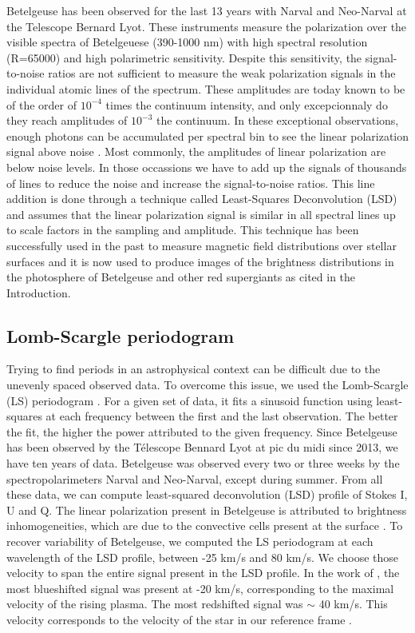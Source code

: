 \documentclass{aa}
\begin{document}
Betelgeuse has been observed for the last 13 years with Narval and Neo-Narval at the Telescope Bernard Lyot. These instruments measure the polarization 
over the visible spectra of Betelgeuese (390-1000 nm) with high spectral resolution (R=65000) and high polarimetric sensitivity. Despite 
this sensitivity, the signal-to-noise ratios are not sufficient to measure the weak polarization signals in the individual atomic lines of the 
spectrum. These amplitudes are today known to be of the order of $10^{-4}$ times the continuum intensity, and only excepcionnaly do they 
reach amplitudes of $10^{-3}$ the continuum. In these exceptional observations, enough photons can be accumulated per spectral bin to 
see the linear polarization signal above noise \citep{auriere_discovery_2016}. Most commonly, the amplitudes of linear polarization are below noise levels. In those 
occassions we have to add up the signals of thousands of lines to reduce the noise and increase the signal-to-noise ratios. This line addition 
is done through a technique called Least-Squares Deconvolution (LSD) \citep{donati_spectropolarimetric_1997} and assumes that the 
linear polarization signal is similar 
in all spectral lines up to scale factors in the sampling and amplitude. This technique has been successfully used in the past to measure 
magnetic field distributions over stellar surfaces and it is now used to produce images of the brightness distributions in the photosphere 
of Betelgeuse and other red supergiants as cited in the Introduction. 


\subsection{Lomb-Scargle periodogram}

Trying to find periods in an astrophysical context can be difficult due to the unevenly spaced observed data. To overcome this issue, 
we used the Lomb-Scargle (LS) periodogram \citep{Lomb1976,Scargle1982}. For a given set of data, it fits a sinusoid function using least-squares at each 
frequency between the first and the last observation. The better the fit, the higher the power attributed to the given frequency. Since Betelgeuse has 
been observed by the Télescope Bennard Lyot at pic du midi since 2013, we have ten years of data. Betelgeuse was observed every two or three weeks by 
the spectropolarimeters Narval and Neo-Narval, except during summer. From all these data, we can compute least-squared 
deconvolution (LSD) \citep{Donati1997} profile of Stokes I, U and Q. The linear polarization present in Betelgeuse is attributed to brightness 
inhomogeneities, which are due to the convective cells present at the surface \citep{LopezAriste2018}. To recover variability of Betelgeuse, 
we computed the LS periodogram at each wavelength of the LSD profile, between -25 km/s and 80 km/s. We choose those velocity to span the entire 
signal present in the LSD profile. In the work of \cite{LopezAriste2018}, the most blueshifted signal was present at -20 km/s, 
corresponding to the maximal velocity of the rising plasma. The most redshifted signal was $\sim$ 40 km/s. This velocity corresponds 
to the velocity of the star in our reference frame \citep{LopezAriste2018}. 
\end{document}
